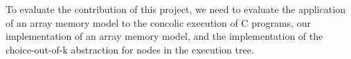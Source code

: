 \documentclass[12pt,twoside]{report}
\begin{document}


%

To evaluate the contribution of this project, we need to evaluate the application of an array memory model to the concolic execution of C programs, our implementation of an array memory model, and the implementation of the choice-out-of-k abstraction for nodes in the execution tree.
\end{document}
